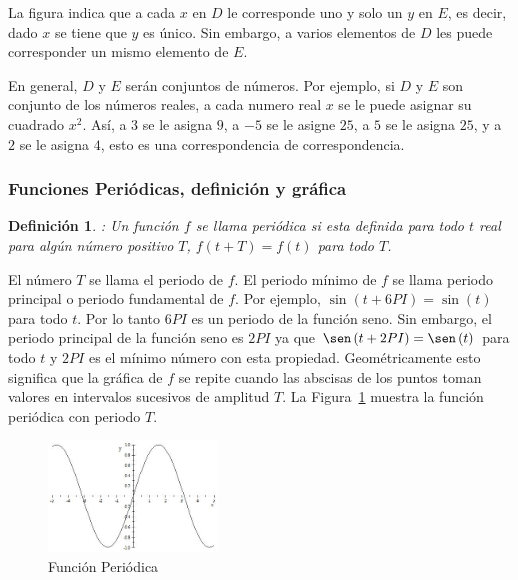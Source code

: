 \documentclass[a4paper]{article}
\newtheorem {dfn}{Definici\'on}
\begin{document}
{} La figura indica que a cada $x$ en $D$ le corresponde uno y solo un $y$
en $E$, es decir, dado $x$ se tiene que $y$ es \'unico. Sin embargo, a
varios elementos de $D$ les puede corresponder un mismo elemento de $E$. 

{} En general, $D$ y $E$ ser\'an conjuntos de n\'umeros. Por ejemplo, si $D$
y $E$ son conjunto de los n\'umeros reales, a cada numero real $x$ se le
puede asignar su cuadrado $x^{2}$. As\'i, a $3$ se le asigna $9$, a $-5$ se
le asigne $25$, a $5$ se le asigna $25$, y a $2$ se le asigna $4$, esto es
una correspondencia de correspondencia.

\subsubsection{Funciones Peri\'odicas, definici\'on y gr\'afica}

\begin{dfn}
: Un funci\'on $f$ se llama peri\'odica si esta definida para todo $t$ real
para alg\'un n\'umero positivo $T$, $f\left(t+T\right)=f\left(t\right)$ para
todo $T$. 
\end{dfn}

{} El n\'umero $T$ se llama el periodo de $f$. El periodo m\'inimo de $f$ se
llama periodo principal o periodo fundamental de $f$. Por ejemplo, $\sin
\left(t + 6PI\right) = \sin \left(t\right)$ para todo $t$. Por lo tanto $6PI$
es un periodo de la funci\'on seno. Sin embargo, el periodo principal de la
funci\'on seno es $2PI$ ya que $\sen \left(t + 2PI\right) = \sen %
\left(t\right)$ para todo $t$ y $2PI$ es el m\'inimo n\'umero con esta
propiedad. Geom\'etricamente esto significa que la gr\'afica de $f$ se
repite cuando las abscisas de los puntos toman valores en intervalos
sucesivos de amplitud $T$. La Figura~\ref{fig:seno1} muestra la funci\'on
peri\'odica con periodo $T$.  
\begin{figure}[h]
\centering
\includegraphics[width=0.40\textwidth]{f1p2.jpg}   
\caption{Funci\'on Peri\'odica}
\label{fig:seno1}
\end{figure}

\newpage 
\end{document}
